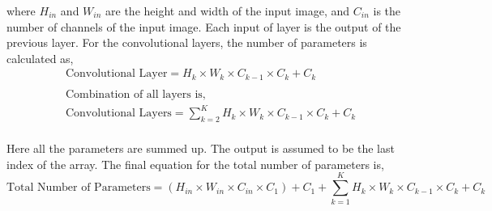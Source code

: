 \documentclass[3p,times,procedia]{elsarticle}
\begin{document}
\begin{enumerate}
    \vspace{-0.25cm}
    where $H_{in}$ and $W_{in}$ are the height and width of the input image, and $C_{in}$ is the number of channels of the input image.
    Each input of layer is the output of the previous layer.
    For the convolutional layers, the number of parameters is calculated as,
    \vspace{-0.5cm}
    \begin{equation*}
        \begin{array}{c}
            \displaystyle \textrm{Convolutional Layer} = H_k \times W_k \times C_{k-1} \times C_k + C_k \\
            \\
            \displaystyle \textrm{Combination of all layers is,} \\
            \displaystyle \textrm{Convolutional Layers} = \sum_{k=2}^{K} H_k \times W_k \times C_{k-1} \times C_k + C_k \\ 
        \end{array}
    \end{equation*}

    \vspace{-0.25cm}
    Here all the parameters are summed up. The output is assumed to be the last index of the array.
    The final equation for the total number of parameters is,
    \vspace{-0.5cm}
    \begin{equation*}
        \textrm{Total Number of Parameters} = (H_{in} \times W_{in} \times C_{in} \times C_1 )+ C_1 + \sum_{k=1}^{K} H_k \times W_k \times C_{k-1} \times C_k + C_k
    \end{equation*}

    \vspace{-0.25cm}

\end{enumerate}


\end{document}
